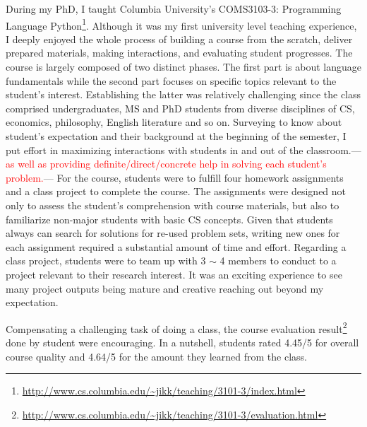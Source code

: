\documentclass[letterpaper, 10pt]{article}
\newcommand{\jikk}[1]{{---\textcolor{red}{#1}---}}
\newcommand{\jikk}[1]{}
\begin{document}
\begin{small}
During my PhD, I taught Columbia University's COMS3103-3: Programming Language
Python\footnote{\url{http://www.cs.columbia.edu/~jikk/teaching/3101-3/index.html}}.
%
%
Although it was my first university level teaching experience, I deeply enjoyed
the whole process of building a course from the scratch, deliver prepared
materials, making interactions, and evaluating student progresses.
% 
The course is largely composed of two distinct phases. The first part is about
language fundamentals while the second part focuses on specific topics relevant
to the student's interest. Establishing the latter was relatively challenging
since the class comprised undergraduates, MS and PhD students from diverse
disciplines of CS, economics, philosophy, English literature and so on.
%
Surveying to know about student's expectation and their background at the
beginning of the semester, I put effort in maximizing interactions with
students in and out of the classroom.\jikk{as well as providing
definite/direct/concrete help in solving each student's problem.}
% 
For the course, students were to fulfill four homework assignments and a class
project to complete the course. 
%
The assignments were designed not only to assess the student's comprehension
with course materials, but also to familiarize non-major students with basic CS
concepts.
%
%
Given that students always can search for solutions for re-used problem sets,
writing new ones for each assignment required a substantial amount of time and
effort. 
%
Regarding a class project, students were to team up with 3 $\sim$ 4 members to
conduct to a project relevant to their research interest.
%
It was an exciting experience to see many project outputs being mature and
creative reaching out beyond my expectation.
%
%

Compensating a challenging task of doing a class, the course evaluation
result\footnote{\url{http://www.cs.columbia.edu/~jikk/teaching/3101-3/evaluation.html}}
done by student were encouraging. In a nutshell, students rated 4.45/5 for
overall course quality and 4.64/5 for the amount they learned from the class.

\vspace{-2pt}

\end{small}
\end{document}
